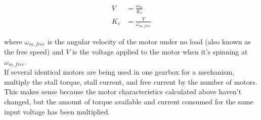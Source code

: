 \begin{align}
  V &= \frac{\omega_m}{K_v} \nonumber \\
  K_v &= \frac{V}{\omega_{m,free}}
\end{align}

where $\omega_{m,free}$ is the angular velocity of the motor under no load (also
known as the free speed) and $V$ is the voltage applied to the motor when
it's spinning at $\omega_{m,free}$. \\

If several identical motors are being used in one gearbox for a mechanism,
multiply the stall torque, stall current, and free current by the number of
motors. This makes sense because the motor characteristics calculated above
haven't changed, but the amount of torque available and current consumed for the
same input voltage has been multiplied.

